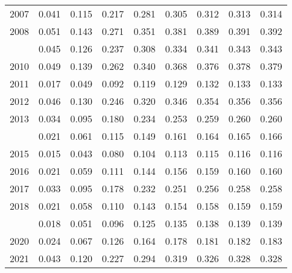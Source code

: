\documentclass[
]{article}
\begin{document}
\begin{longtable}[t]{lrrrrrrrr}
2007 & 0.041 & 0.115 & 0.217 & 0.281 & 0.305 & 0.312 & 0.313 & 0.314\\
2008 & 0.051 & 0.143 & 0.271 & 0.351 & 0.381 & 0.389 & 0.391 & 0.392\\
\addlinespace
2009 & 0.045 & 0.126 & 0.237 & 0.308 & 0.334 & 0.341 & 0.343 & 0.343\\
2010 & 0.049 & 0.139 & 0.262 & 0.340 & 0.368 & 0.376 & 0.378 & 0.379\\
2011 & 0.017 & 0.049 & 0.092 & 0.119 & 0.129 & 0.132 & 0.133 & 0.133\\
2012 & 0.046 & 0.130 & 0.246 & 0.320 & 0.346 & 0.354 & 0.356 & 0.356\\
2013 & 0.034 & 0.095 & 0.180 & 0.234 & 0.253 & 0.259 & 0.260 & 0.260\\
\addlinespace
2014 & 0.021 & 0.061 & 0.115 & 0.149 & 0.161 & 0.164 & 0.165 & 0.166\\
2015 & 0.015 & 0.043 & 0.080 & 0.104 & 0.113 & 0.115 & 0.116 & 0.116\\
2016 & 0.021 & 0.059 & 0.111 & 0.144 & 0.156 & 0.159 & 0.160 & 0.160\\
2017 & 0.033 & 0.095 & 0.178 & 0.232 & 0.251 & 0.256 & 0.258 & 0.258\\
2018 & 0.021 & 0.058 & 0.110 & 0.143 & 0.154 & 0.158 & 0.159 & 0.159\\
\addlinespace
2019 & 0.018 & 0.051 & 0.096 & 0.125 & 0.135 & 0.138 & 0.139 & 0.139\\
2020 & 0.024 & 0.067 & 0.126 & 0.164 & 0.178 & 0.181 & 0.182 & 0.183\\
2021 & 0.043 & 0.120 & 0.227 & 0.294 & 0.319 & 0.326 & 0.328 & 0.328\\*
\end{longtable}
\end{document}
